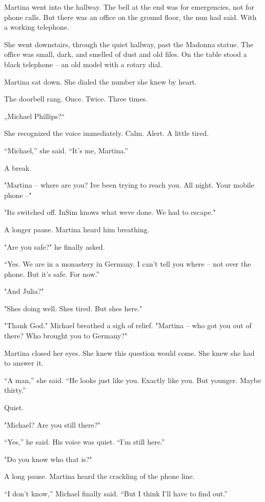 \documentclass[
]{article}
\begin{document}
Martina went into the hallway. The bell at the end was for emergencies, not for phone calls. But there was an office on the ground floor, the nun had said. With a working telephone.

She went downstairs, through the quiet hallway, past the Madonna statue. The office was small, dark, and smelled of dust and old files. On the table stood a black telephone -- an old model with a rotary dial.

Martina sat down. She dialed the number she knew by heart.

The doorbell rang. Once. Twice. Three times.

„Michael Phillips?{\kern0pt}``

She recognized the voice immediately. Calm. Alert. A little tired.

``Michael,'' she said. ``It's me, Martina.''

A break.

"Martina -- where are you? I\textquotesingle ve been trying to reach you. All night. Your mobile phone --"

"It\textquotesingle s switched off. InSim knows what we\textquotesingle ve done. We had to escape."

A longer pause. Martina heard him breathing.

"Are you safe?" he finally asked.

``Yes. We are in a monastery in Germany. I can't tell you where -- not over the phone. But it's safe. For now.''

"And Julia?"

"She\textquotesingle s doing well. She\textquotesingle s tired. But she\textquotesingle s here."

"Thank God." Michael breathed a sigh of relief. "Martina -- who got you out of there? Who brought you to Germany?"

Martina closed her eyes. She knew this question would come. She knew she had to answer it.

``A man,'' she said. ``He looks just like you. Exactly like you. But younger. Maybe thirty.''

Quiet.

"Michael? Are you still there?"

``Yes,'' he said. His voice was quiet. ``I'm still here.''

"Do you know who that is?"

A long pause. Martina heard the crackling of the phone line.

``I don't know,'' Michael finally said. ``But I think I'll have to find out.''
\end{document}
